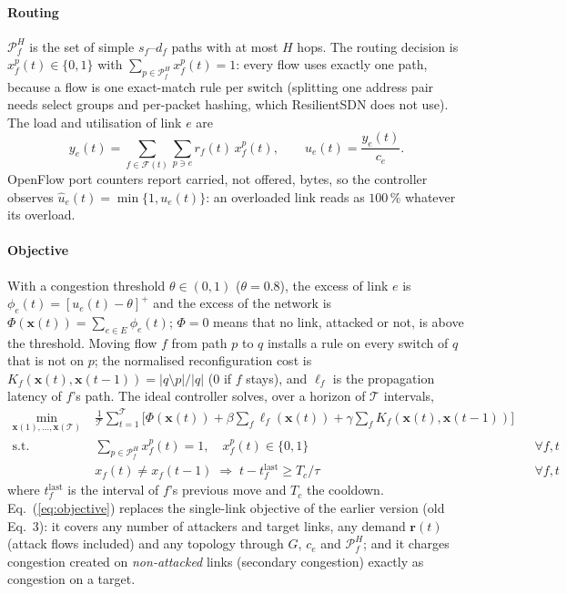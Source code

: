 \paragraph{Routing}
$\mathcal{P}_f^H$ is the set of simple $s_f$--$d_f$ paths with at most $H$ hops. The routing
decision is $x_f^p(t)\in\{0,1\}$ with $\sum_{p\in\mathcal{P}_f^H}x_f^p(t)=1$: every flow uses
exactly one path, because a flow is one exact-match rule per switch (splitting one address pair
needs select groups and per-packet hashing, which ResilientSDN does not use). The load and
utilisation of link $e$ are
\begin{equation}
  y_e(t)=\sum_{f\in\mathcal{F}(t)}\sum_{p\ni e} r_f(t)\,x_f^p(t),\qquad
  u_e(t)=\frac{y_e(t)}{c_e}.
  \label{eq:load}
\end{equation}
OpenFlow port counters report carried, not offered, bytes, so the controller observes
$\hat u_e(t)=\min\{1,u_e(t)\}$: an overloaded link reads as $100\,\%$ whatever its overload.

\paragraph{Objective}
With a congestion threshold $\theta\in(0,1)$ ($\theta=0.8$), the excess of link $e$ is
$\phi_e(t)=[u_e(t)-\theta]^+$ and the excess of the network is
$\Phi(\mathbf{x}(t))=\sum_{e\in E}\phi_e(t)$; $\Phi=0$ means that no link, attacked or not, is
above the threshold. Moving flow $f$ from path $p$ to $q$ installs a rule on every switch of $q$
that is not on $p$; the normalised reconfiguration cost is
$K_f(\mathbf{x}(t),\mathbf{x}(t-1))=|q\setminus p|/|q|$ (0 if $f$ stays), and $\ell_f$ is the
propagation latency of $f$'s path. The ideal controller solves, over a horizon of $\mathcal{T}$
intervals,
\begin{align}
  \min_{\mathbf{x}(1),\dots,\mathbf{x}(\mathcal{T})}\;
   & \frac{1}{\mathcal{T}}\sum_{t=1}^{\mathcal{T}}\Big[\Phi(\mathbf{x}(t))
     + \beta\sum_{f}\ell_f(\mathbf{x}(t))
     + \gamma\sum_{f}K_f(\mathbf{x}(t),\mathbf{x}(t-1))\Big]
     \label{eq:objective}\\
  \text{s.t.}\;
   & \textstyle\sum_{p\in\mathcal{P}_f^H}x_f^p(t)=1,\quad x_f^p(t)\in\{0,1\}
     && \forall f,t \label{eq:unsplit}\\
   & x_f(t)\neq x_f(t-1)\;\Rightarrow\; t-t_f^{\mathrm{last}}\ge T_c/\tau
     && \forall f,t \label{eq:cooldown}
\end{align}
where $t_f^{\mathrm{last}}$ is the interval of $f$'s previous move and $T_c$ the cooldown.
Eq.~(\ref{eq:objective}) replaces the single-link objective of the earlier version (old Eq.~3):
it covers any number of attackers and target links, any demand $\mathbf{r}(t)$ (attack flows
included) and any topology through $G$, $c_e$ and $\mathcal{P}_f^H$; and it charges congestion
created on \emph{non-attacked} links (secondary congestion) exactly as congestion on a target.


